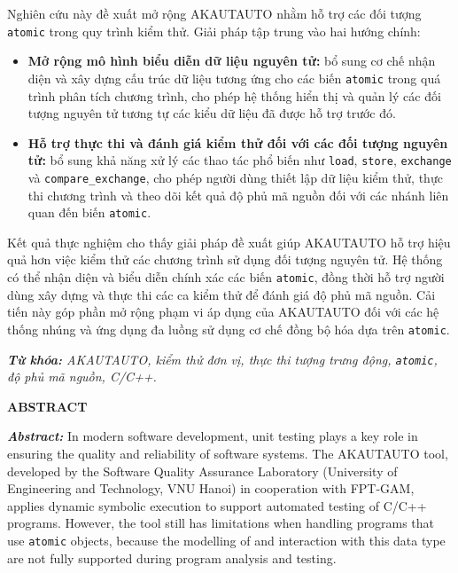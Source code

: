 Nghiên cứu này đề xuất mở rộng AKAUTAUTO nhằm hỗ trợ các đối tượng \texttt{atomic} trong quy trình kiểm thử. Giải pháp
tập trung vào hai hướng chính:

\begin{itemize}
    \item \textbf{Mở rộng mô hình biểu diễn dữ liệu nguyên tử:} bổ sung cơ chế nhận diện và xây dựng cấu trúc dữ liệu
    tương ứng cho các biến \texttt{atomic} trong quá trình phân tích chương trình, cho phép hệ thống hiển thị và quản lý
    các đối tượng nguyên tử tương tự các kiểu dữ liệu đã được hỗ trợ trước đó.
    \item \textbf{Hỗ trợ thực thi và đánh giá kiểm thử đối với các đối tượng nguyên tử:} bổ sung khả năng xử lý các thao
    tác phổ biến như \texttt{load}, \texttt{store}, \texttt{exchange} và \texttt{compare\_exchange}, cho phép người dùng
    thiết lập dữ liệu kiểm thử, thực thi chương trình và theo dõi kết quả độ phủ mã nguồn đối với các nhánh liên quan đến
    biến \texttt{atomic}.
\end{itemize}

Kết quả thực nghiệm cho thấy giải pháp đề xuất giúp AKAUTAUTO hỗ trợ hiệu quả hơn việc kiểm thử các chương trình sử dụng
đối tượng nguyên tử. Hệ thống có thể nhận diện và biểu diễn chính xác các biến \texttt{atomic}, đồng thời hỗ trợ người
dùng xây dựng và thực thi các ca kiểm thử để đánh giá độ phủ mã nguồn. Cải tiến này góp phần mở rộng phạm vi áp dụng của
AKAUTAUTO đối với các hệ thống nhúng và ứng dụng đa luồng sử dụng cơ chế đồng bộ hóa dựa trên \texttt{atomic}.

\vspace{-0.5cm}
\begin{flushleft}
  \textit{\textbf{Từ khóa: }AKAUTAUTO, kiểm thử đơn vị, thực thi tượng trưng động, \texttt{atomic}, độ phủ mã nguồn, C/C++.}
\end{flushleft}

\newpage
{}
\begin{center}
    \textbf{ABSTRACT}
\end{center}
\changefontsizes[16pt]{12pt}

\textit{\textbf{Abstract:}} In modern software development, unit testing plays a key role in ensuring the quality and
reliability of software systems. The AKAUTAUTO tool, developed by the Software Quality Assurance Laboratory (University of
Engineering and Technology, VNU Hanoi) in cooperation with FPT-GAM, applies dynamic symbolic execution to support automated
testing of C/C++ programs. However, the tool still has limitations when handling programs that use \texttt{atomic} objects,
because the modelling of and interaction with this data type are not fully supported during program analysis and testing.

